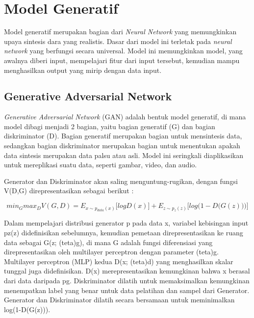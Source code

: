 \section{Model Generatif}
\label{sec:modelGeneratif}

Model generatif merupakan bagian dari \emph{Neural Network} yang memungkinkan upaya sintesis dara yang realistis. 
Dasar dari model ini terletak pada \emph{neural network} yang berfungsi secara universal. 
Model ini memungkinkan model, yang awalnya diberi input, mempelajari fitur dari input tersebut, kemudian mampu menghasilkan output yang mirip dengan data input.

\subsection{Generative Adversarial Network}
\label{subsec:generativeAdversarialNetwork}

\emph{Generative Adversarial Network} (GAN) adalah bentuk model generatif, di mana model dibagi menjadi 2 bagian, yaitu bagian generatif (G) dan bagian diskriminator (D). 
Bagian generatif merupakan bagian untuk mensintesis data, sedangkan bagian diskriminator merupakan bagian untuk menentukan apakah data sintesis merupakan data palsu atau asli. 
Model ini seringkali diaplikasikan untuk mereplikasi suatu data, seperti gambar, video, dan audio.

Generator dan Diskriminator akan saling menguntung-rugikan, dengan fungsi V(D,G) direpresentasikan sebagai berikut : 

\begin{equation}
  \label{eq:GAN}
  min_{G} max_{D} V(G,D) =  E_{x \sim p_{data} (x)} \big[ log D(x) \big] + E_{z \sim p_{z} (z)} \big[ log  \big(1-D \big(G(z)\big) \big) \big]
\end{equation}

Dalam mempelajari distribusi generator p pada data x, variabel kebisingan input pz(z) didefinisikan sebelumnya, kemudian pemetaan direpresentasikan ke ruang data sebagai G(z; (teta)g), di mana G adalah fungsi diferensiasi yang direpresentasikan oleh multilayer perceptron dengan parameter (teta)g. 
Multilayer perceptron (MLP) kedua D(x; (teta)d) yang menghasilkan skalar tunggal juga didefinisikan. 
D(x) merepresentasikan kemungkinan bahwa x berasal dari data daripada pg. 
Diskriminator dilatih untuk memaksimalkan kemungkinan menempatkan label yang benar untuk data pelatihan dan sampel dari Generator. 
Generator dan  Diskriminator dilatih secara bersamaan untuk meminimalkan log(1-D(G(z))). \parencite{GAN}

